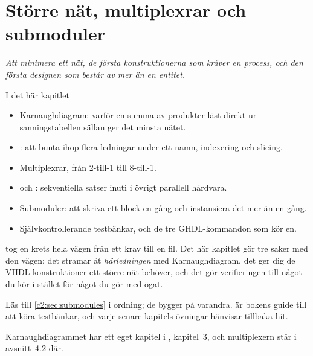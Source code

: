 
\chapter{Större nät, multiplexrar och submoduler}
\label{c2:ch}

{\large\itshape Att minimera ett nät, de första konstruktionerna som kräver en process, och den
första designen som består av mer än en entitet.\par}

\begin{chapterbox}{I det här kapitlet}
\begin{itemize}
  \item Karnaughdiagram: varför en summa-av-produkter läst direkt ur sanningstabellen sällan ger
    det minsta nätet.
  \item {}: att bunta ihop flera ledningar under ett namn, indexering och
    slicing.
  \item Multiplexrar, från 2-till-1 till 8-till-1.
  \item {} och : sekventiella satser inuti i övrigt parallell hårdvara.
  \item Submoduler: att skriva ett block en gång och instansiera det mer än en gång.
  \item Självkontrollerande testbänkar, och de tre GHDL-kommandon som kör en.
\end{itemize}
\end{chapterbox}

 tog en krets hela vägen från ett krav till en fil. Det här kapitlet gör tre saker
med den vägen: det stramar åt \emph{härledningen} med Karnaughdiagram, det ger dig de
VHDL-konstruktioner ett större nät behöver, och det gör verifieringen till något du kör i stället
för något du gör med ögat.

Läs  till \ref{c2:sec:submodules} i ordning; de bygger på varandra.
 är bokens guide till att köra testbänkar, och varje senare kapitels
övningar hänvisar tillbaka hit.

\note[Repetition] Karnaughdiagrammet har ett eget kapitel i \debook{}, kapitel~3, och multiplexern
står i avsnitt~4.2 där.





